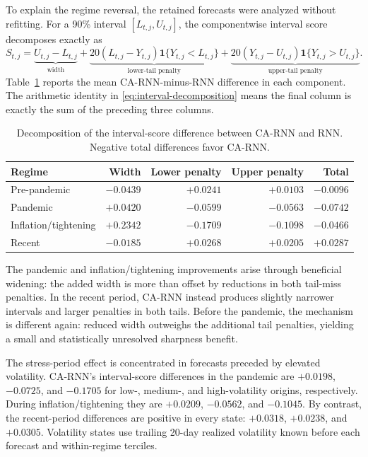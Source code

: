 \documentclass[11pt]{article}
\newcommand{\ind}{\mathbf{1}}
\begin{document}
To explain the regime reversal, the retained forecasts were analyzed without
refitting. For a 90\% interval $[L_{t,j},U_{t,j}]$, the componentwise interval
score decomposes exactly as
\begin{equation}
 S_{t,j}=\underbrace{U_{t,j}-L_{t,j}}_{\text{width}}
 +\underbrace{20(L_{t,j}-Y_{t,j})\ind\{Y_{t,j}<L_{t,j}\}}_{\text{lower-tail penalty}}
 +\underbrace{20(Y_{t,j}-U_{t,j})\ind\{Y_{t,j}>U_{t,j}\}}_{\text{upper-tail penalty}}.
 \label{eq:interval-decomposition}
\end{equation}
Table~\ref{tab:interval-mechanism} reports the mean CA-RNN-minus-RNN
difference in each component. The arithmetic identity in
\eqref{eq:interval-decomposition} means the final column is exactly the sum of the
preceding three columns.

\begin{table}[ht]
\centering
\caption{Decomposition of the interval-score difference between CA-RNN and RNN.
Negative total differences favor CA-RNN.}
\label{tab:interval-mechanism}
\begin{tabular}{lrrrr}
\toprule
Regime & Width & Lower penalty & Upper penalty & Total \\
\midrule
Pre-pandemic & $-0.0439$ & $+0.0241$ & $+0.0103$ & $-0.0096$ \\
Pandemic & $+0.0420$ & $-0.0599$ & $-0.0563$ & $-0.0742$ \\
Inflation/tightening & $+0.2342$ & $-0.1709$ & $-0.1098$ & $-0.0466$ \\
Recent & $-0.0185$ & $+0.0268$ & $+0.0205$ & $+0.0287$ \\
\bottomrule
\end{tabular}
\end{table}

The pandemic and inflation/tightening improvements arise through beneficial
widening: the added width is more than offset by reductions in both tail-miss
penalties. In the recent period, CA-RNN instead produces slightly
narrower intervals and larger penalties in both tails. Before the pandemic, the
mechanism is different again: reduced width outweighs the additional tail
penalties, yielding a small and statistically unresolved sharpness benefit.

The stress-period effect is concentrated in forecasts preceded by elevated
volatility. CA-RNN's interval-score differences in the pandemic are
$+0.0198$, $-0.0725$, and $-0.1705$ for low-, medium-, and high-volatility
origins, respectively. During inflation/tightening they are $+0.0209$, $-0.0562$,
and $-0.1045$. By contrast, the recent-period differences are positive in every
state: $+0.0318$, $+0.0238$, and $+0.0305$. Volatility states use trailing 20-day
realized volatility known before each forecast and within-regime terciles.
\end{document}
